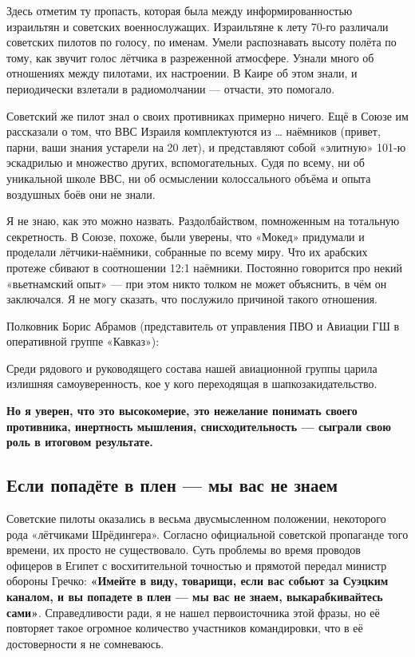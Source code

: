Здесь отметим ту пропасть, которая была между информированностью израильтян и советских военнослужащих. Израильтяне к лету 70-го различали советских пилотов по голосу, по именам. Умели распознавать высоту полёта по тому, как звучит голос лётчика в разреженной атмосфере. Узнали много об отношениях между пилотами, их настроении. В Каире об этом знали, и периодически взлетали в радиомолчании — отчасти, это помогало.

Советский же пилот знал о своих противниках примерно ничего. Ещё в Союзе им рассказали о том, что ВВС Израиля комплектуются из … наёмников (привет, парни, ваши знания устарели на 20 лет), и представляют собой «элитную» 101-ю эскадрилью и множество других, вспомогательных. Судя по всему, ни об уникальной школе ВВС, ни об осмыслении колоссального объёма и опыта воздушных боёв они не знали.

Я не знаю, как это можно назвать. Раздолбайством, помноженным на тотальную секретность. В Союзе, похоже, были уверены, что «Мокед» придумали и проделали лётчики-наёмники, собранные по всему миру. Что их арабских протеже сбивают в соотношении 12:1 наёмники. Постоянно говорится про некий «вьетнамский опыт» — при этом никто толком не может объяснить, в чём он заключался. Я не могу сказать, что послужило причиной такого отношения.

Полковник Борис Абрамов (представитель от управления ПВО и Авиации ГШ в оперативной группе «Кавказ»):

\begin{textcitation}
	Среди рядового и руководящего состава нашей авиационной группы царила излишняя самоуверенность, кое у кого переходящая в шапкозакидательство.
\end{textcitation}

\textbf{Но я уверен, что это высокомерие, это нежелание понимать своего противника, инертность мышления, снисходительность — сыграли свою роль в итоговом результате.}

\subsection{Если попадёте в плен — мы вас не знаем}

Советские пилоты оказались в весьма двусмысленном положении, некоторого рода «лётчиками Шрёдингера». Согласно официальной советской пропаганде того времени, их просто не существовало. Суть проблемы во время проводов офицеров в Египет с восхитительной точностью и прямотой передал министр обороны Гречко: \textbf{«Имейте в виду, товарищи, если вас собьют за Суэцким каналом, и вы попадете в плен — мы вас не знаем, выкарабкивайтесь сами»}. Справедливости ради, я не нашел первоисточника этой фразы, но её повторяет такое огромное количество участников командировки, что в её достоверности я не сомневаюсь.

